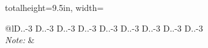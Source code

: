 \begin{table}[H]
\begin{adjustbox}{totalheight=9.5in, width=\columnwidth }
{\begin{tabular}{@{\extracolsep{5pt}}lD{.}{.}{-3} D{.}{.}{-3} D{.}{.}{-3} D{.}{.}{-3} D{.}{.}{-3} D{.}{.}{-3} D{.}{.}{-3} D{.}{.}{-3} D{.}{.}{-3} }
\hline 
\hline \\[-1.8ex]
\textit{Note:}  &  \\ 
\end{tabular}   }
\end{adjustbox}
\caption{Quantile Regression (2014-2019): Non-Financial Corporations} 
  \label{qq.npl_nfi} 
\end{table} 
